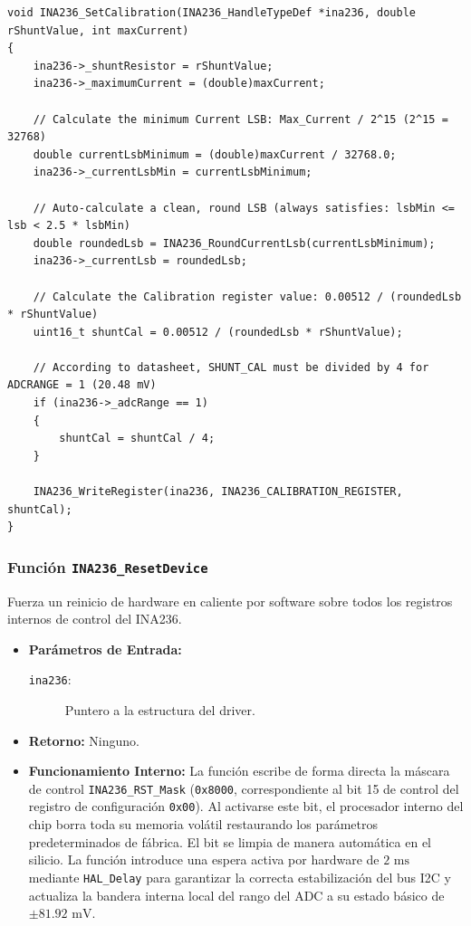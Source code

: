 \documentclass[
10pt, %
a4paper, %
oneside, %
headinclude,footinclude, %
BCOR5mm, %
]{scrartcl}
\begin{document}
\begin{lstlisting}[style=CMakeStyle]
void INA236_SetCalibration(INA236_HandleTypeDef *ina236, double rShuntValue, int maxCurrent)
{
    ina236->_shuntResistor = rShuntValue;
    ina236->_maximumCurrent = (double)maxCurrent;

    // Calculate the minimum Current LSB: Max_Current / 2^15 (2^15 = 32768)
    double currentLsbMinimum = (double)maxCurrent / 32768.0; 
    ina236->_currentLsbMin = currentLsbMinimum;

    // Auto-calculate a clean, round LSB (always satisfies: lsbMin <= lsb < 2.5 * lsbMin)
    double roundedLsb = INA236_RoundCurrentLsb(currentLsbMinimum);
    ina236->_currentLsb = roundedLsb;

    // Calculate the Calibration register value: 0.00512 / (roundedLsb * rShuntValue)
    uint16_t shuntCal = 0.00512 / (roundedLsb * rShuntValue);

    // According to datasheet, SHUNT_CAL must be divided by 4 for ADCRANGE = 1 (20.48 mV)
    if (ina236->_adcRange == 1)
    {
        shuntCal = shuntCal / 4;
    }

    INA236_WriteRegister(ina236, INA236_CALIBRATION_REGISTER, shuntCal);
}
\end{lstlisting}

\subsubsection{Función \texttt{INA236\_ResetDevice}}
Fuerza un reinicio de hardware en caliente por software sobre todos los registros internos de control del INA236.

\begin{itemize}
	\item \textbf{Parámetros de Entrada:}
		\begin{description}
			\item[\texttt{ina236}:] Puntero a la estructura del driver.
		\end{description}
	\item \textbf{Retorno:} Ninguno.
	\item \textbf{Funcionamiento Interno:}
		La función escribe de forma directa la máscara de control \texttt{INA236\_RST\_Mask} (\texttt{0x8000}, correspondiente al bit 15 de control del registro de configuración \texttt{0x00}). Al activarse este bit, el procesador interno del chip borra toda su memoria volátil restaurando los parámetros predeterminados de fábrica. El bit se limpia de manera automática en el silicio.
		La función introduce una espera activa por hardware de $2\text{ ms}$ mediante \texttt{HAL\_Delay} para garantizar la correcta estabilización del bus I2C y actualiza la bandera interna local del rango del ADC a su estado básico de $\pm 81.92\text{ mV}$.
\end{itemize}
\end{document}
